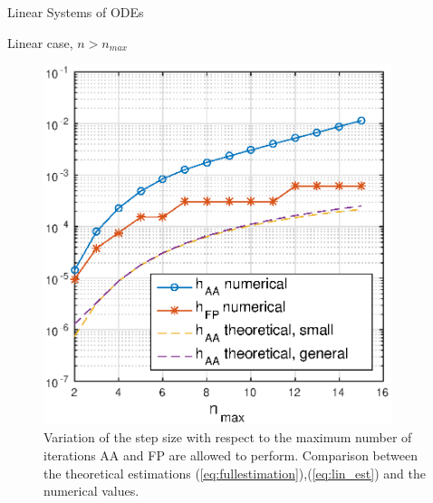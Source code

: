 \documentclass{article}
\begin{document}
\begin{section}{Linear Systems of ODEs}
\begin{subsection}{Linear case, $n > n_{max}$}
\begin{figure}[t!]
\centering
\includegraphics[width=4in]{Pictures/hVSnmax}
\caption{Variation of the step size with respect to the maximum number of iterations AA and FP are allowed to perform. Comparison between the theoretical estimations (\ref{eq:fullestimation}),(\ref{eq:lin_est}) and the numerical values.}
\label{fig:hVSnmax}
\end{figure}

\end{subsection}
\end{section}
\end{document}
